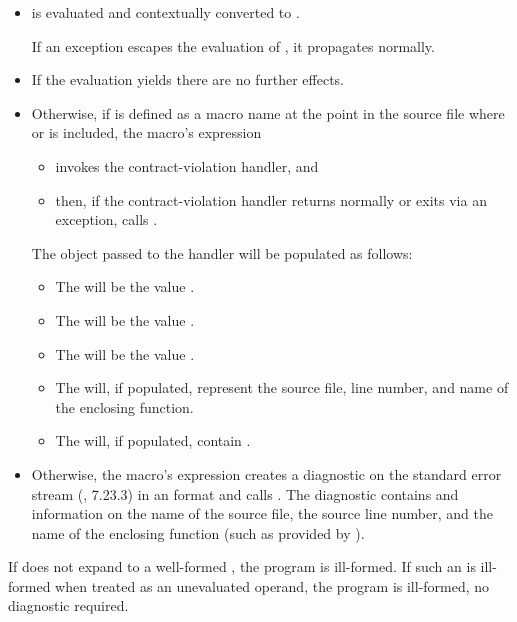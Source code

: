 \begin{itemize}
\item
{} is evaluated and contextually converted to .
\begin{note}
If an exception escapes
the evaluation of ,
it propagates normally.
\end{note}
\item
If the evaluation yields  there are no further effects.
\item
Otherwise, if 
is defined as a macro name
at the point in the source file where
 or 
is included,
the  macro's expression
\begin{itemize}
\item
invokes the contract-violation handler, and
\item
then, if the contract-violation handler
returns normally
or
exits via an exception,
calls .
\end{itemize}
The  object
passed to the handler
will be populated as follows:
\begin{itemize}
\item
  The 
  will be
  the value .
\item
  The 
  will be
  the value .
\item
  The 
  will be
  the value .
\item
  The  will,
  if populated,
  represent the source file, line number,
  and name of the enclosing function.
\item
  The  will,
  if populated,
  contain \tcode{\#}.
\end{itemize}
\item
Otherwise, the  macro's expression
creates a diagnostic on the standard error stream (\IsoC{}, 7.23.3) in an
format and calls .
The diagnostic contains \tcode{\#} and
information on
the name of the source file,
the source line number, and
the name of the enclosing function
(such as provided by ).
\end{itemize}

\pnum
If  does not expand to
a  well-formed ,
the program is ill-formed.
If such an  is ill-formed when
treated as an unevaluated operand,
the program is ill-formed, no diagnostic required.

